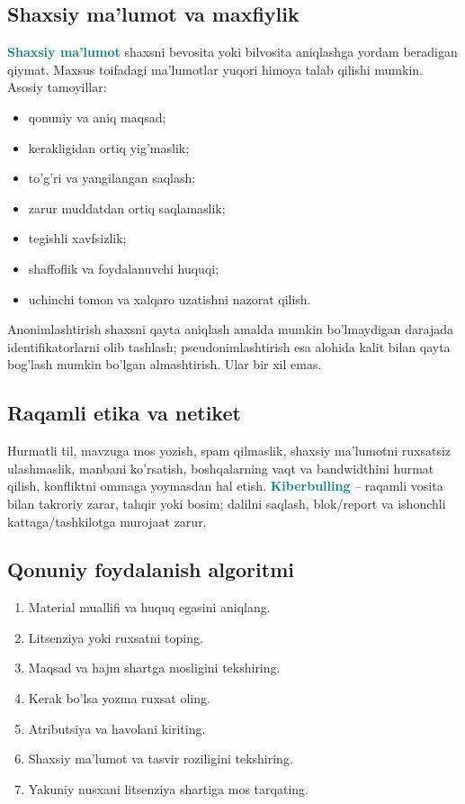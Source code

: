 \documentclass[11pt,a4paper,oneside]{book}
\newcommand{\term}[1]{\textbf{\textcolor{Teal}{#1}}\index{#1}}
\begin{document}
\subsection{Shaxsiy ma'lumot va maxfiylik}
\term{Shaxsiy ma'lumot} shaxsni bevosita yoki bilvosita aniqlashga yordam beradigan qiymat. Maxsus toifadagi ma'lumotlar yuqori himoya talab qilishi mumkin. Asosiy tamoyillar:
\begin{itemize}
\item qonuniy va aniq maqsad;
\item kerakligidan ortiq yig'maslik;
\item to'g'ri va yangilangan saqlash;
\item zarur muddatdan ortiq saqlamaslik;
\item tegishli xavfsizlik;
\item shaffoflik va foydalanuvchi huquqi;
\item uchinchi tomon va xalqaro uzatishni nazorat qilish.
\end{itemize}

\begin{clarify}
Anonimlashtirish shaxsni qayta aniqlash amalda mumkin bo'lmaydigan darajada identifikatorlarni olib tashlash; pseudonimlashtirish esa alohida kalit bilan qayta bog'lash mumkin bo'lgan almashtirish. Ular bir xil emas.
\end{clarify}

\subsection{Raqamli etika va netiket}
Hurmatli til, mavzuga mos yozish, spam qilmaslik, shaxsiy ma'lumotni ruxsatsiz ulashmaslik, manbani ko'rsatish, boshqalarning vaqt va bandwidthini hurmat qilish, konfliktni ommaga yoymasdan hal etish. \term{Kiberbulling} -- raqamli vosita bilan takroriy zarar, tahqir yoki bosim; dalilni saqlash, blok/report va ishonchli kattaga/tashkilotga murojaat zarur.

\subsection{Qonuniy foydalanish algoritmi}
\begin{enumerate}
\item Material muallifi va huquq egasini aniqlang.
\item Litsenziya yoki ruxsatni toping.
\item Maqsad va hajm shartga mosligini tekshiring.
\item Kerak bo'lsa yozma ruxsat oling.
\item Atributsiya va havolani kiriting.
\item Shaxsiy ma'lumot va tasvir roziligini tekshiring.
\item Yakuniy nusxani litsenziya shartiga mos tarqating.
\end{enumerate}
\end{document}
